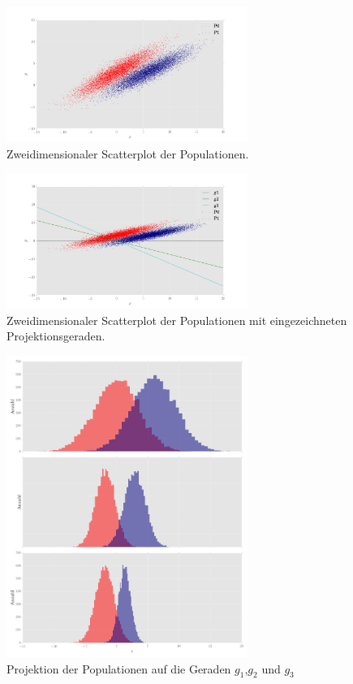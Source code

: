 \begin{figure}
	\centering
	\includegraphics[width=0.7\textwidth]{scatter_P0_P1.png}
	\caption{Zweidimensionaler Scatterplot der Populationen.}
\end{figure}
\begin{figure}
	\centering
	\includegraphics[width=0.7\textwidth]{scatter_with_lines.png}
	\caption{Zweidimensionaler Scatterplot der Populationen mit eingezeichneten Projektionsgeraden.}
\end{figure}
\begin{figure}
	\centering
	\includegraphics[width=0.7\textwidth]{hists_proj.png}
	\caption{Projektion der Populationen auf die Geraden $g_1$,$g_2$ und $g_3$}
\end{figure}

